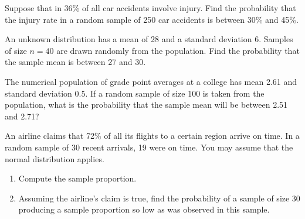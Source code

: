 \vspace*{6\baselineskip}

\begin{example}

Suppose that in 36\% of all car accidents involve injury. Find the
probability that the injury rate in a random sample of 250 car accidents
is between 30\% and 45\%.

\end{example}

\vspace*{6\baselineskip}

\begin{exercise}

An unknown distribution has a mean of 28 and a standard deviation 6.
Samples of size \(n = 40\) are drawn randomly from the population. Find the
probability that the sample mean is between 27 and 30.

\end{exercise}

\vspace*{6\baselineskip}

\begin{exercise}

The numerical population of grade point averages at a college has mean
2.61 and standard deviation 0.5. If a random sample of size 100 is taken
from the population, what is the probability that the sample mean will
be between 2.51 and 2.71?

\end{exercise}

\vspace*{6\baselineskip}

\begin{exercise}

An airline claims that 72\% of all its flights to a certain region
arrive on time. In a random sample of 30 recent arrivals, 19 were on
time. You may assume that the normal distribution applies.

\begin{enumerate}
\item
  Compute the sample proportion.
\item
  Assuming the airline's claim is true, find the probability of a sample
  of size 30 producing a sample proportion so low as was observed in
  this sample.
\end{enumerate}

\end{exercise}

